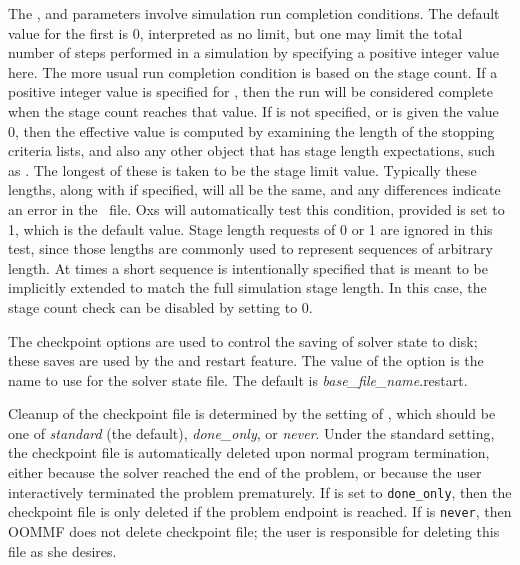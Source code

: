 \begin{description}
The ,  and
 parameters involve simulation run
completion conditions.  The default value for the first is 0,
interpreted as no limit, but one may limit the total number of steps
performed in a simulation by specifying a positive integer value here.
The more usual run completion condition is based on the stage count.  If
a positive integer value is specified for , then the
run will be considered complete when the stage count reaches that value.
If  is not specified, or is given the value 0, then the
effective  value is computed by examining the
length of the stopping criteria lists, and also any other 
object that has stage length expectations, such as
.  The longest of these is
taken to be the stage limit value.  Typically these lengths, along with
 if specified, will all be the same, and any
differences indicate an error in the \MIF\ file.  Oxs will automatically
test this condition, provided  is set to 1,
which is the default value.  Stage length requests of 0 or 1 are ignored
in this test, since those lengths are commonly used to represent
sequences of arbitrary length.  At times a short sequence is
intentionally specified that is meant to be implicitly extended to match
the full simulation stage length.  In this case, the stage count check
can be disabled by setting  to 0.

The checkpoint%
options are used to control the saving of solver state to disk; these
saves are used by the  and  restart feature.
The value of the  option is the name to
use for the solver state file.  The default is
\textit{base\_file\_name}.restart.

Cleanup of the checkpoint file is determined by the setting of
, which should be one of
\textit{standard} (the default), \textit{done\_only}, or \textit{never}.
Under the standard setting, the checkpoint file is automatically deleted
upon normal program termination, either because the solver reached the end
of the problem, or because the user interactively terminated the problem
prematurely.  If  is set to
\texttt{done\_only}, then the checkpoint file is only deleted if the
problem endpoint is reached.  If  is
\texttt{never}, then OOMMF does not delete checkpoint file; the
user is responsible for deleting this file as she desires.


\end{description}
